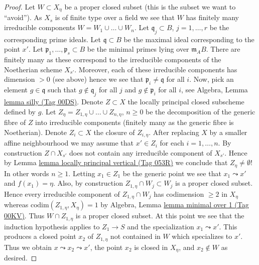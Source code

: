\documentclass{amsart}
\theoremstyle{plain}
\theoremstyle{definition}
\theoremstyle{remark}
\numberwithin{equation}{subsection}
\begin{document}
\begin{proof}
\medskip\noindent
Let $W \subset X_\eta$ be a proper closed subset (this is the
subset we want to ``avoid''). As $X_s$ is of finite type over a field
we see that $W$ has finitely many irreducible components
$W = W_1 \cup \ldots \cup W_n$. Let
$\mathfrak q_j \subset B$, $j = 1, \ldots, r$
be the corresponding prime ideals. Let $\mathfrak q \subset B$
be the maximal ideal corresponding to the point $x'$.
Let $\mathfrak p_1, \ldots, \mathfrak p_s \subset B$ be the
minimal primes lying over $\mathfrak m_AB$. There are finitely
many as these correspond to the irreducible components of the
Noetherian scheme $X_{s'}$. Moreover, each of these irreducible
components has dimension $> 0$ (see above) hence we see that
$\mathfrak p_i \not = \mathfrak q$ for all $i$.
Now, pick an element $g \in \mathfrak q$ such that
$g \not \in \mathfrak q_j$ for all $j$ and $g \not \in \mathfrak p_i$
for all $i$, see
Algebra, Lemma \href{https://stacks.math.columbia.edu/tag/00DS}{lemma silly (Tag 00DS)}.
Denote $Z \subset X$ the locally principal closed subscheme defined by $g$.
Let $Z_\eta = Z_{1, \eta} \cup \ldots \cup Z_{n, \eta}$, $n \geq 0$
be the decomposition of the generic fibre of $Z$ into irreducible
components (finitely many as the generic fibre is Noetherian).
Denote $Z_i \subset X$ the closure of $Z_{i, \eta}$.
After replacing $X$ by a smaller affine neighbourhood
we may assume that $x' \in Z_i$ for each $i = 1, \ldots, n$.
By construction $Z \cap X_{s'}$ does not contain any irreducible
component of $X_{s'}$. Hence by
Lemma \href{https://stacks.math.columbia.edu/tag/053R}{lemma locally principal vertical (Tag 053R)}
we conclude that $Z_\eta \not = \emptyset$! In other words
$n \geq 1$. Letting $x_1 \in Z_1$ be the generic point we see
that $x_1 \leadsto x'$ and $f(x_1) = \eta$.
Also, by construction $Z_{1, \eta} \cap W_j \subset W_j$
is a proper closed subset. Hence every irreducible component of
$Z_{1, \eta} \cap W_j$ has codimension $\geq 2$ in $X_\eta$
whereas $\text{codim}(Z_{1, \eta}, X_\eta) = 1$ by
Algebra, Lemma \href{https://stacks.math.columbia.edu/tag/00KV}{lemma minimal over 1 (Tag 00KV)}.
Thus $W \cap Z_{1, \eta}$ is a proper closed subset.
At this point we see that the induction hypothesis applies to
$Z_1 \to S$ and the specialization $x_1 \leadsto x'$.
This produces a closed point $x_2$ of $Z_{1, \eta}$ not contained
in $W$ which specializes to $x'$. Thus we obtain
$x \leadsto x_2 \leadsto x'$, the point $x_2$ is closed in $X_\eta$,
and $x_2 \not \in W$ as desired.
\end{proof}
\end{document}

